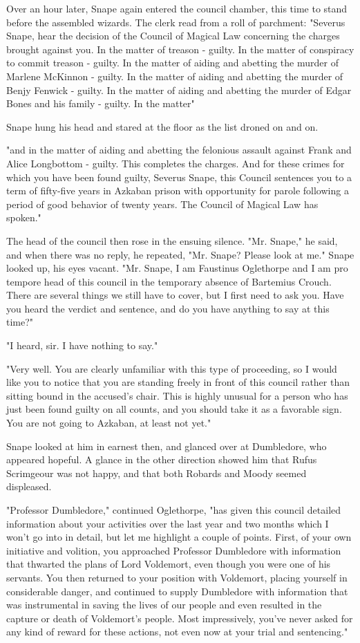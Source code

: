 Over an hour later, Snape again entered the council chamber, this time to stand before the assembled wizards. The clerk read from a roll of parchment: "Severus Snape, hear the decision of the Council of Magical Law concerning the charges brought against you. In the matter of treason - guilty. In the matter of conspiracy to commit treason - guilty. In the matter of aiding and abetting the murder of Marlene McKinnon - guilty. In the matter of aiding and abetting the murder of Benjy Fenwick - guilty. In the matter of aiding and abetting the murder of Edgar Bones and his family - guilty. In the matter{\el}"

Snape hung his head and stared at the floor as the list droned on and on.

"{\el}and in the matter of aiding and abetting the felonious assault against Frank and Alice Longbottom - guilty. This completes the charges. And for these crimes for which you have been found guilty, Severus Snape, this Council sentences you to a term of fifty-five years in Azkaban prison with opportunity for parole following a period of good behavior of twenty years. The Council of Magical Law has spoken."

The head of the council then rose in the ensuing silence. "Mr. Snape," he said, and when there was no reply, he repeated, "Mr. Snape? Please look at me." Snape looked up, his eyes vacant. "Mr. Snape, I am Faustinus Oglethorpe and I am pro tempore head of this council in the temporary absence of Bartemius Crouch. There are several things we still have to cover, but I first need to ask you. Have you heard the verdict and sentence, and do you have anything to say at this time?"

"I heard, sir. I have nothing to say."

"Very well. You are clearly unfamiliar with this type of proceeding, so I would like you to notice that you are standing freely in front of this council rather than sitting bound in the accused's chair. This is highly unusual for a person who has just been found guilty on all counts, and you should take it as a favorable sign. You are not going to Azkaban, at least not yet."

Snape looked at him in earnest then, and glanced over at Dumbledore, who appeared hopeful. A glance in the other direction showed him that Rufus Scrimgeour was not happy, and that both Robards and Moody seemed displeased.

"Professor Dumbledore," continued Oglethorpe, "has given this council detailed information about your activities over the last year and two months which I won't go into in detail, but let me highlight a couple of points. First, of your own initiative and volition, you approached Professor Dumbledore with information that thwarted the plans of Lord Voldemort, even though you were one of his servants. You then returned to your position with Voldemort, placing yourself in considerable danger, and continued to supply Dumbledore with information that was instrumental in saving the lives of our people and even resulted in the capture or death of Voldemort's people. Most impressively, you've never asked for any kind of reward for these actions, not even now at your trial and sentencing."

